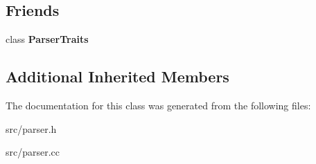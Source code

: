 \subsection*{Friends}
\begin{DoxyCompactItemize}
\item 
\hypertarget{classv8_1_1internal_1_1_parser_a5f14c645eff20b2a5bad62347cde341c}{}class {\bfseries Parser\+Traits}\label{classv8_1_1internal_1_1_parser_a5f14c645eff20b2a5bad62347cde341c}

\end{DoxyCompactItemize}
\subsection*{Additional Inherited Members}


The documentation for this class was generated from the following files\+:\begin{DoxyCompactItemize}
\item 
src/parser.\+h\item 
src/parser.\+cc\end{DoxyCompactItemize}
